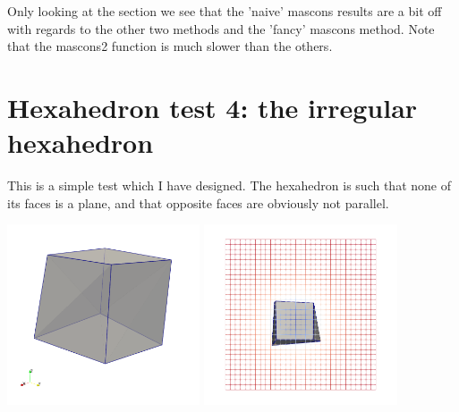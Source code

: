 Only looking at the section we see that the 'naive' mascons results are 
a bit off with regards to the other two methods and the 'fancy' mascons method.
Note that the mascons2 function is much slower than the others.

\section*{Hexahedron test 4: the irregular hexahedron}

This is a simple test which I have designed. The hexahedron is such that 
none of its faces is a plane, and that opposite faces are obviously 
not parallel. 

\begin{center}
\includegraphics[width=5.7cm]{python_codes/fieldstone_113/results/hex_test4/myblock_2}
\includegraphics[width=5.7cm]{python_codes/fieldstone_113/results/hex_test4/myblock_1}
\end{center}

